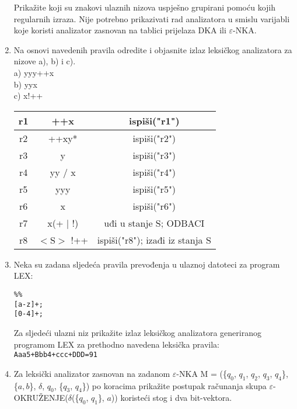 \documentclass[times, 12pt, utf8]{book}
\begin{document}
\begin{enumerate}[resume]
Prikažite koji su znakovi ulaznih nizova uspješno grupirani pomoću kojih regularnih izraza.
Nije potrebno prikazivati rad analizatora u smislu varijabli koje koristi analizator zasnovan na tablici prijelaza DKA ili \(\varepsilon\)-NKA. \cite[str.~47-48]{udzbenik} \cite{auditorne}

\item
Na osnovi navedenih pravila odredite i objasnite izlaz leksičkog analizatora za nizove a), b) i c). \cite[str.~47-48]{udzbenik} \cite{auditorne}\\
a) yyy++x\\
b) yyx\\
c) x!++

\begin{tabular}{|c|c|c|} \hline
r1 & ++x & ispiši("r1") \\ \hline
r2 & ++xy* & ispiši("r2") \\ \hline
r3 & y & ispiši("r3") \\ \hline
r4 & yy / x & ispiši("r4") \\ \hline
r5 & yyy & ispiši("r5") \\ \hline
r6 & x & ispiši("r6") \\ \hline
r7 & x(+ \(\mid\) !) & uđi u stanje S; ODBACI \\ \hline
r8 & \(<\)S\(>\) !++ & ispiši("r8"); izađi iz stanja S \\ \hline
\end{tabular}

\item
Neka su zadana sljedeća pravila prevođenja u ulaznoj datoteci za program LEX:

\begin{alltt}
\%\%
[a-z]+	;
[0-4]+	;
\end{alltt}

Za sljedeći ulazni niz prikažite izlaz leksičkog analizatora generiranog programom LEX za prethodno navedena leksička pravila: \texttt{Aaa5+Bbb4+ccc+DDD=91} \cite[str.~64-70]{udzbenik}

\item
Za leksički analizator zasnovan na zadanom \(\varepsilon\)-NKA M = (\{\(q_{0}\), \(q_{1}\), \(q_{2}\), \(q_{3}\), \(q_{4}\)\}, \{\(a, b\)\}, \(\delta\), \(q_{0}\), \{\(q_{3}\), \(q_{4}\)\}) po koracima prikažite postupak računanja skupa \(\varepsilon\)-OKRUŽENJE(\(\delta\)(\{\(q_{0}\), \(q_{1}\)\}, \(a\))) koristeći stog i dva bit-vektora. \cite[str.~60-62]{udzbenik}


\end{enumerate}
\end{document}

